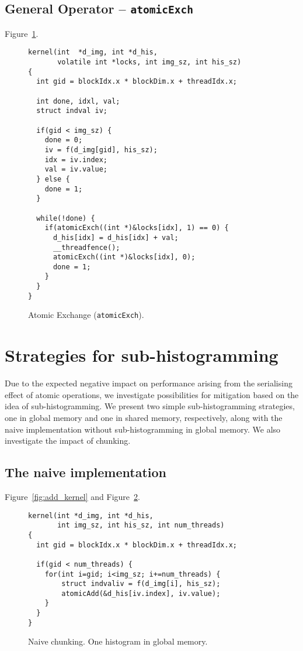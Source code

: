 \subsection{General Operator -- \texttt{atomicExch}}

Figure~\ref{fig:exch_kernel}.
%
\begin{figure}
\begin{lstlisting}
kernel(int  *d_img, int *d_his,
       volatile int *locks, int img_sz, int his_sz)
{
  int gid = blockIdx.x * blockDim.x + threadIdx.x;

  int done, idxl, val;
  struct indval iv;

  if(gid < img_sz) {
    done = 0;
    iv = f(d_img[gid], his_sz);
    idx = iv.index;
    val = iv.value;
  } else {
    done = 1;
  }

  while(!done) {
    if(atomicExch((int *)&locks[idx], 1) == 0) {
      d_his[idx] = d_his[idx] + val;
      __threadfence();
      atomicExch((int *)&locks[idx], 0);
      done = 1;
    }
  }
}
\end{lstlisting}
\caption{Atomic Exchange (\texttt{atomicExch}).}
\label{fig:exch_kernel}
\end{figure}
%


\section{Strategies for sub-histogramming}
\label{sec:sub_histogramming}

Due to the expected negative impact on performance arising
from the serialising effect of atomic operations, we
investigate possibilities for mitigation based on the idea
of sub-histogramming. We present two simple
sub-histogramming strategies, one in global memory and one
in shared memory, respectively, along with the naive
implementation without sub-histogramming in global
memory. We also investigate the impact of chunking. 


\subsection{The naive implementation}

Figure~\ref{fig:add_kernel} and
Figure~\ref{fig:naive_chunking}.
%
\begin{figure}
\begin{lstlisting}
kernel(int *d_img, int *d_his,
       int img_sz, int his_sz, int num_threads)
{
  int gid = blockIdx.x * blockDim.x + threadIdx.x;

  if(gid < num_threads) {
    for(int i=gid; i<img_sz; i+=num_threads) {
        struct indvaliv = f(d_img[i], his_sz);
        atomicAdd(&d_his[iv.index], iv.value);
    }
  }
}
\end{lstlisting}
\caption{Naive chunking. One histogram in global memory.}
\label{fig:naive_chunking}
\end{figure}
%


